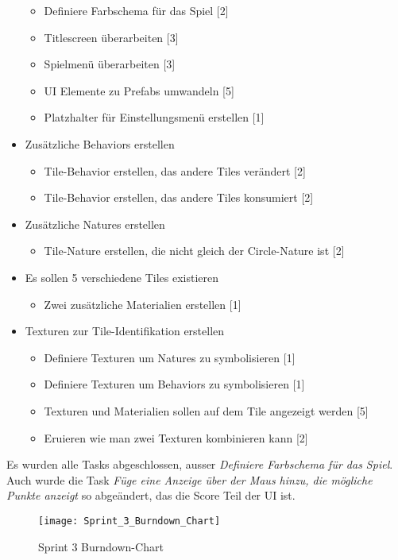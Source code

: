 \documentclass[../main.tex]{subfiles}
\begin{document}
\begin{itemize}
		\begin{itemize}
			\item Definiere Farbschema für das Spiel [2]
			\item Titlescreen überarbeiten [3]
			\item Spielmenü überarbeiten [3]
			\item UI Elemente zu Prefabs umwandeln [5]
			\item Platzhalter für Einstellungsmenü erstellen [1]
		\end{itemize}
		\item Zusätzliche Behaviors erstellen
		\begin{itemize}
			\item Tile-Behavior erstellen, das andere Tiles verändert [2]
			\item Tile-Behavior erstellen, das andere Tiles konsumiert [2]
		\end{itemize}
		\item Zusätzliche Natures erstellen
		\begin{itemize}
			\item Tile-Nature erstellen, die nicht gleich der Circle-Nature ist [2]
		\end{itemize}	
		\item Es sollen 5 verschiedene Tiles existieren
		\begin{itemize}
			\item Zwei zusätzliche Materialien erstellen [1]
		\end{itemize}	
		\item Texturen zur Tile-Identifikation erstellen
		\begin{itemize}
			\item Definiere Texturen um Natures zu symbolisieren [1]
			\item Definiere Texturen um Behaviors zu symbolisieren [1]
			\item Texturen und Materialien sollen auf dem Tile angezeigt werden [5]
			\item Eruieren wie man zwei Texturen kombinieren kann [2]
		\end{itemize}
	\end{itemize} 

	\par Es wurden alle Tasks abgeschlossen, ausser \emph{Definiere Farbschema für das Spiel}. Auch wurde die Task \emph{Füge eine Anzeige über der Maus hinzu, die mögliche Punkte anzeigt} so abgeändert, das die Score Teil der UI ist.
	
	\begin{figure}[H]
		\centering
		\texttt{[image: Sprint\_3\_Burndown\_Chart]}
		\caption{Sprint 3 Burndown-Chart}
	\end{figure}
\end{document}
